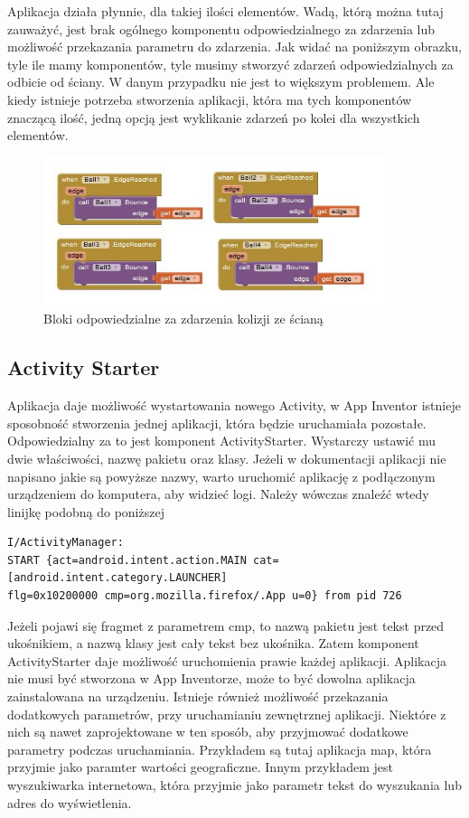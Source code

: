 Aplikacja działa płynnie, dla takiej ilości elementów. Wadą, którą można tutaj zauważyć, jest brak ogólnego komponentu odpowiedzialnego za zdarzenia lub możliwość przekazania parametru do zdarzenia. Jak widać na poniższym obrazku, tyle ile mamy komponentów, tyle musimy stworzyć zdarzeń odpowiedzialnych za odbicie od ściany. W danym przypadku nie jest to większym problemem. Ale kiedy istnieje potrzeba stworzenia aplikacji, która ma tych komponentów znaczącą ilość, jedną opcją jest wyklikanie zdarzeń po kolei dla wszystkich elementów.


\begin{figure}[H]
\centering\includegraphics[width=10cm]{figures/apps/ai_collision_blocks}
\caption{Bloki odpowiedzialne za zdarzenia kolizji ze ścianą}
\end{figure}

\subsection{Activity Starter}

Aplikacja daje możliwość wystartowania nowego Activity, w App Inventor istnieje sposobność stworzenia jednej aplikacji, która będzie uruchamiała pozostałe. Odpowiedzialny za to jest komponent ActivityStarter. Wystarczy ustawić mu dwie właściwości, nazwę pakietu oraz klasy. Jeżeli w dokumentacji aplikacji nie napisano jakie są powyższe nazwy, warto uruchomić aplikację z podłączonym urządzeniem do komputera, aby widzieć logi. Należy wówczas znaleźć wtedy linijkę podobną do poniższej

\begin{lstlisting}
I/ActivityManager:
START {act=android.intent.action.MAIN cat=[android.intent.category.LAUNCHER]
flg=0x10200000 cmp=org.mozilla.firefox/.App u=0} from pid 726
\end{lstlisting}

Jeżeli pojawi się fragmet z parametrem cmp, to nazwą pakietu jest tekst przed ukośnikiem, a nazwą klasy jest cały tekst bez ukośnika. Zatem komponent ActivityStarter daje możliwość uruchomienia prawie każdej aplikacji. Aplikacja nie musi być stworzona w App Inventorze, może to być dowolna aplikacja zainstalowana na urządzeniu. Istnieje również możliwość przekazania dodatkowych parametrów, przy uruchamianiu zewnętrznej aplikacji. Niektóre z nich są nawet zaprojektowane w ten sposób, aby przyjmować dodatkowe parametry podczas uruchamiania. Przykładem są tutaj aplikacja map, która przyjmie jako paramter wartości geograficzne. Innym przykładem jest wyszukiwarka internetowa, która przyjmie jako parametr tekst do wyszukania lub adres do wyświetlenia.

